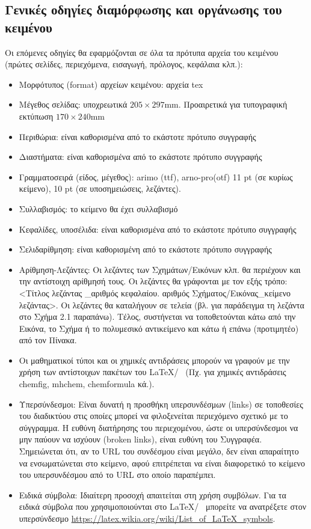 \subsection{Γενικές οδηγίες διαμόρφωσης και οργάνωσης του κειμένου}
Οι επόμενες οδηγίες θα εφαρμόζονται σε όλα τα πρότυπα αρχεία του κειμένου (πρώτες
σελίδες, περιεχόμενα, εισαγωγή, πρόλογος, κεφάλαια κλπ.):
\begin{itemize}
\item Μορφότυπος (format) αρχείων κειμένου: αρχεία tex
\item Μέγεθος σελίδας: υποχρεωτικά $205\times297$mm. Προαιρετικά για τυπογραφική εκτύπωση $170\times240$mm
\item Περιθώρια: είναι καθορισμένα από το εκάστοτε πρότυπο συγγραφής
\item Διαστήματα: είναι καθορισμένα από το εκάστοτε πρότυπο συγγραφής
\item Γραμματοσειρά (είδος, μέγεθος): arimo (ttf), arno-pro(otf) 11 pt (σε κυρίως κείμενο), 10 pt (σε υποσημειώσεις, λεζάντες).
\item Συλλαβισμός: το κείμενο θα έχει συλλαβισμό
\item Κεφαλίδες, υποσέλιδα: είναι καθορισμένα από το εκάστοτε πρότυπο συγγραφής
\item Σελιδαρίθμηση: είναι καθορισμένη από το εκάστοτε πρότυπο συγγραφής
\item Αρίθμηση-Λεζάντες: Οι λεζάντες των Σχημάτων/Εικόνων κλπ. θα περιέχουν και την
αντίστοιχη αρίθμησή τους. Οι λεζάντες θα γράφονται με τον εξής τρόπο: <Τίτλος λεζάντας
\_αριθμός κεφαλαίου. αριθμός Σχήματος/Εικόνας\_κείμενο λεζάντας>. Οι λεζάντες θα
καταλήγουν σε τελεία (βλ. για παράδειγμα τη λεζάντα στο Σχήμα 2.1 παραπάνω). Τέλος,
συστήνεται να τοποθετούνται κάτω από την Εικόνα, το Σχήμα ή το πολυμεσικό
αντικείμενο και κάτω ή επάνω (προτιμητέο) από τον Πίνακα.
\item Οι μαθηματικοί τύποι και οι χημικές αντιδράσεις μπορούν να γραφούν με την χρήση
των αντίστοιχων πακέτων του \LaTeX / \XeLaTeX\ (Πχ. για χημικές αντιδράσεις chemfig,
mhchem, chemformula κά.).
\item Υπερσύνδεσμοι: Είναι δυνατή η προσθήκη υπερσυνδέσμων (links) σε τοποθεσίες του
διαδικτύου στις οποίες μπορεί να φιλοξενείται περιεχόμενο σχετικό με το σύγγραμμα. Η
ευθύνη διατήρησης του περιεχομένου, ώστε οι υπερσύνδεσμοι να μην παύουν να ισχύουν
(broken links), είναι ευθύνη του Συγγραφέα. Σημειώνεται ότι, αν το URL του συνδέσμου
είναι μεγάλο, δεν είναι απαραίτητο να ενσωματώνεται στο κείμενο, αφού επιτρέπεται να
είναι διαφορετικό το κείμενο του υπερσυνδέσμου από το URL στο οποίο παραπέμπει.
\item Ειδικά σύμβολα: Ιδιαίτερη προσοχή απαιτείται στη χρήση συμβόλων. Για τα ειδικά σύμβολα
που χρησιμοποιούνται στο \LaTeX / \XeLaTeX\ μπορείτε να ανατρέξετε στον υπερσύνδεσμο
\url{https://latex.wikia.org/wiki/List_of_LaTeX_symbols}.
\end{itemize}

